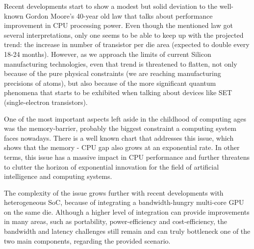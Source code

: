 \documentclass[12pt,journal,compsoc]{IEEEtran}
\begin{document}
% 
% 
% 
% 
\indent Recent developments start to show a modest but solid deviation to the well-known Gordon Moore's 40-year old law that talks about performance improvement in CPU processing power. Even though the mentioned law got several interpretations, only one seems to be able to keep up with the projected trend: the increase in number of transistor per die area (expected to double every 18-24 months). However, as we approach the limits of current Silicon manufacturing technologies, even that trend is threatened to flatten, not only because of the pure physical constraints (we are reaching manufacturing precisions of atoms), but also because of the more significant quantum phenomena that starts to be exhibited when talking about devices like SET (single-electron transistors).

One of the most important aspects left aside in the childhood of computing ages was the memory-barrier, probably the biggest constraint a computing system faces nowadays. There is a well known chart that addresses this issue, which shows that the memory - CPU gap also grows at an exponential rate. In other terms, this issue has a massive impact in CPU performance and further threatens to clutter the horizon of exponential innovation for the field of artificial intelligence and computing systems.

The complexity of the issue grows further with recent developments with heterogeneous SoC, because of integrating a bandwidth-hungry multi-core GPU on the same die. Although a higher level of integration can provide improvements in many areas, such as portability, power-efficiency and cost-efficiency, the bandwidth and latency challenges still remain and can truly bottleneck one of the two main components, regarding the provided scenario.
\end{document}
